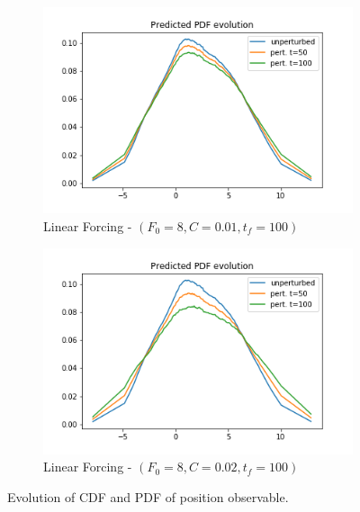 \documentclass{article}
\begin{document}
\begin{figure}[!ht]
\begin{subfigure}[b]{0.48\textwidth}
		\includegraphics[width=1\linewidth]{fig/pred_pdf_position_below_L_001_100.png}
		\caption{Linear Forcing - $(F_0=8, C=0.01, t_f=100)$}
		\label{fig:pred_pdf_position_below_L_001_100}
	\end{subfigure}%
	\begin{subfigure}[b]{0.48\textwidth}
		\includegraphics[width=1\linewidth]{fig/pred_pdf_position_below_L_002_100.png}
		\caption{Linear Forcing - $(F_0=8, C=0.02, t_f=100)$}
		\label{fig:pred_pdf_position_below_L_001_200}
	\end{subfigure}
	\caption{Evolution of CDF and PDF of position observable.}
	\label{fig:pred_position_cdf_pdf}
\end{figure}


\clearpage



\end{document}
